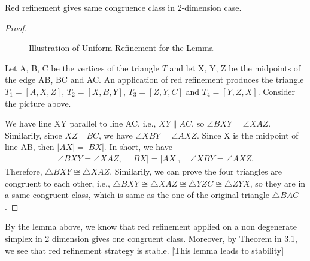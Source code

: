     \begin{lemma*}
    Red refinement gives same congruence class in 2-dimension case.
    \end{lemma*}
    \begin{proof}\mbox{}\\
    \begin{figure}
    \centering
    \caption{Illustration of Uniform Refinement for the Lemma}
    \end{figure}

    Let A, B, C be the vertices of the triangle $T$ and let X, Y, Z be the midpoints of the edge AB, BC and AC. An application of red refinement produces the triangle $T_1 = [A, X, Z]$, $T_2 = [X, B, Y]$, $T_3 = [Z, Y, C]$ and $T_4 = [Y, Z, X]$. Consider the picture above.

    We have line XY parallel to line AC, i.e., $XY \parallel AC$, so $\angle{BXY} = \angle{XAZ}$. Similarily, since $XZ\parallel BC$, we have $\angle{XBY} = \angle{AXZ}$. Since X is the midpoint of line AB, then $|AX| = |BX|$. In short, we have 
    \begin{align*}
    \angle{BXY} = \angle{XAZ},
    \quad
    |BX| = |AX|,
    \quad
    \angle{XBY} = \angle{AXZ}.
    \end{align*}
    Therefore, $\triangle{BXY} \cong \triangle{XAZ}$. Similarily, we can prove the four triangles are congruent to each other, i.e., $\triangle{BXY}\cong\triangle{XAZ}\cong\triangle{YZC} \cong\triangle{ZYX}$, so they are in a same congruent class, which is same as the one of the original triangle $\triangle{BAC}$.
    \end{proof}
    By the lemma above, we know that red refinement applied on a non degenerate simplex in 2 dimension gives one congruent class. Moreover, by Theorem in 3.1, we see that red refinement strategy is stable.
    [This lemma leads to stability]

